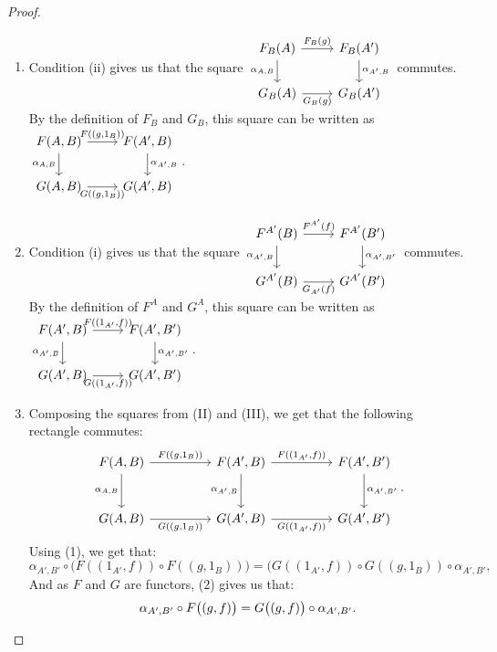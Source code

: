 \documentclass[a4paper]{article}
\theoremstyle{definition}
\begin{document}
\begin{proof}
\begin{enumerate}[label=(\Roman*)]
			\item Condition (ii) gives us that the square
				$\begin{tikzcd}
					F_B(A) \arrow[swap]{d}{\alpha_{A,B}} \arrow{r}{F_B(g)}
					& F_B(A') \arrow{d}{\alpha_{A',B}}\\
					G_B(A) \arrow[swap]{r}{G_B(g)}
					& G_B(A')
				\end{tikzcd}$
				 commutes. By the definition of $F_B$ and $G_B$,
				this square can be written as
				$\begin{tikzcd}
					F(A,B) \arrow[swap]{d}{\alpha_{A,B}} \arrow{r}{F((g,1_B))}
					& F(A',B) \arrow{d}{\alpha_{A',B}}\\
					G(A,B) \arrow[swap]{r}{G((g,1_B))}
					& G(A',B)
				\end{tikzcd}
				$.
			\item Condition (i) gives us that the square
				$\begin{tikzcd}
					F^{A'}(B) \arrow[swap]{d}{\alpha_{A',B}} \arrow{r}{F^{A'}(f)}
					& F^{A'}(B') \arrow{d}{\alpha_{A',B'}}\\
					G^{A'}(B) \arrow[swap]{r}{G_{A'}(f)}
					& G^{A'}(B')
				\end{tikzcd}$
				commutes. By the definition of $F^A$ and $G^A$,
				this square can be written as
				$
				\begin{tikzcd}
					F(A',B) \arrow[swap]{d}{\alpha_{A',B}} \arrow{r}{F((1_{A'},f))}
					& F(A',B') \arrow{d}{\alpha_{A',B'}}\\
					G(A',B) \arrow[swap]{r}{G((1_{A'},f))}
					& G(A',B')
				\end{tikzcd}
				$.
			\item Composing the squares from (II) and (III), we get that the following
				rectangle commutes:
				\begin{equation}	\begin{tikzcd}[row sep=large, column sep=huge]
					F(A,B) \arrow[swap]{d}{\alpha_{A,B}} \arrow{r}{F((g,1_B))}
					& F(A',B) \arrow[swap]{d}{\alpha_{A',B}} \arrow{r}{F((1_{A'},f))}
					& F(A',B') \arrow{d}{\alpha_{A',B'}}\\
					G(A,B) \arrow[swap]{r}{G((g,1_B))}
					& G(A',B)\arrow[swap]{r}{G((1_{A'},f))}	& G(A',B')
				\end{tikzcd}.\end{equation}
				Using (1), we get that:
				\begin{equation} \alpha_{A',B'} \circ \big( F((1_{A'},f))\circ F((g,1_B))\big)
				=\big( G((1_{A'},f))\circ G((g,1_B)) \circ \alpha_{A',B'} ,\end{equation}
					And as $F$ and $G$ are functors, (2) gives us that:
					\[ \alpha_{A',B'} \circ F\big((g,f)\big)
					=G\big((g,f)\big) \circ \alpha_{A',B'}. \qedhere \]
			\end{enumerate}
			\mbox{}
		\end{proof}
\end{document}
